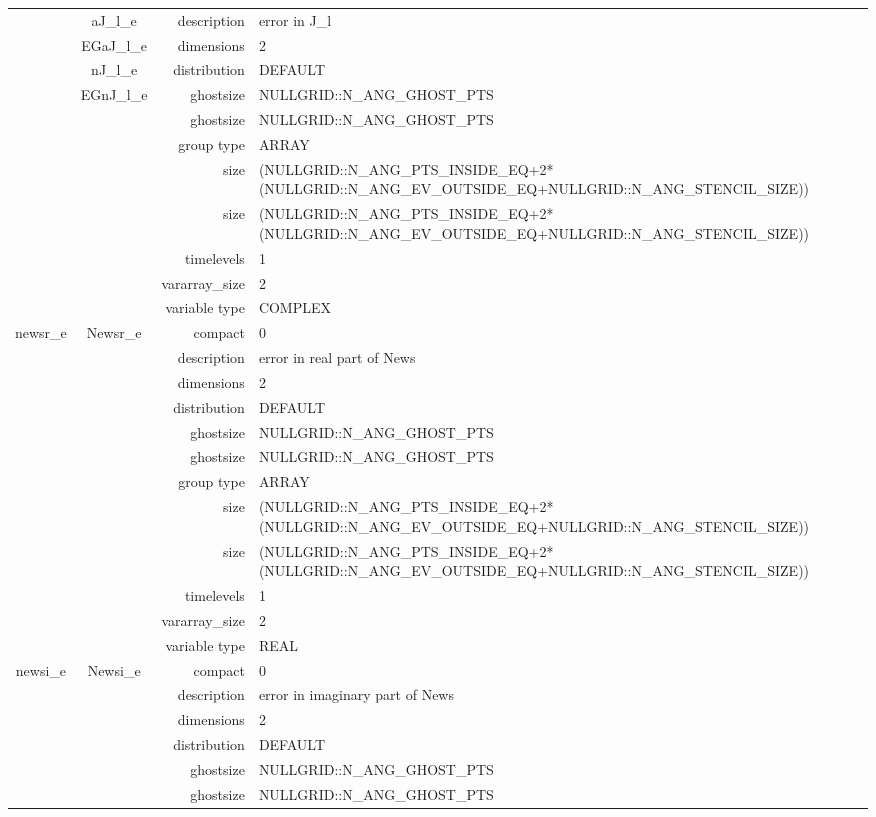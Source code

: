 \begin{tabular*}{150mm}{|c|c@{\extracolsep{\fill}}|rl|}
 & aJ\_l\_e & description & error in J\_l \\ 
 & EGaJ\_l\_e & dimensions & 2 \\ 
 & nJ\_l\_e & distribution & DEFAULT \\ 
 & EGnJ\_l\_e & ghostsize & NULLGRID::N\_ANG\_GHOST\_PTS \\ 
& ~ & ghostsize & NULLGRID::N\_ANG\_GHOST\_PTS \\ 
 &  & group type & ARRAY \\ 
 &  & size & (NULLGRID::N\_ANG\_PTS\_INSIDE\_EQ+2*(NULLGRID::N\_ANG\_EV\_OUTSIDE\_EQ+NULLGRID::N\_ANG\_STENCIL\_SIZE)) \\ 
& ~ & size & (NULLGRID::N\_ANG\_PTS\_INSIDE\_EQ+2*(NULLGRID::N\_ANG\_EV\_OUTSIDE\_EQ+NULLGRID::N\_ANG\_STENCIL\_SIZE)) \\ 
 &  & timelevels & 1 \\ 
 &  & vararray\_size & 2 \\ 
 &  & variable type & COMPLEX \\ 
\hline 
newsr\_e & Newsr\_e & compact & 0 \\ 
 &  & description & error in real part of News \\ 
 &  & dimensions & 2 \\ 
 &  & distribution & DEFAULT \\ 
 &  & ghostsize & NULLGRID::N\_ANG\_GHOST\_PTS \\ 
& ~ & ghostsize & NULLGRID::N\_ANG\_GHOST\_PTS \\ 
 &  & group type & ARRAY \\ 
 &  & size & (NULLGRID::N\_ANG\_PTS\_INSIDE\_EQ+2*(NULLGRID::N\_ANG\_EV\_OUTSIDE\_EQ+NULLGRID::N\_ANG\_STENCIL\_SIZE)) \\ 
& ~ & size & (NULLGRID::N\_ANG\_PTS\_INSIDE\_EQ+2*(NULLGRID::N\_ANG\_EV\_OUTSIDE\_EQ+NULLGRID::N\_ANG\_STENCIL\_SIZE)) \\ 
 &  & timelevels & 1 \\ 
 &  & vararray\_size & 2 \\ 
 &  & variable type & REAL \\ 
\hline 
newsi\_e & Newsi\_e & compact & 0 \\ 
 &  & description & error in imaginary part of News \\ 
 &  & dimensions & 2 \\ 
 &  & distribution & DEFAULT \\ 
 &  & ghostsize & NULLGRID::N\_ANG\_GHOST\_PTS \\ 
& ~ & ghostsize & NULLGRID::N\_ANG\_GHOST\_PTS \\ 

\end{tabular*}
